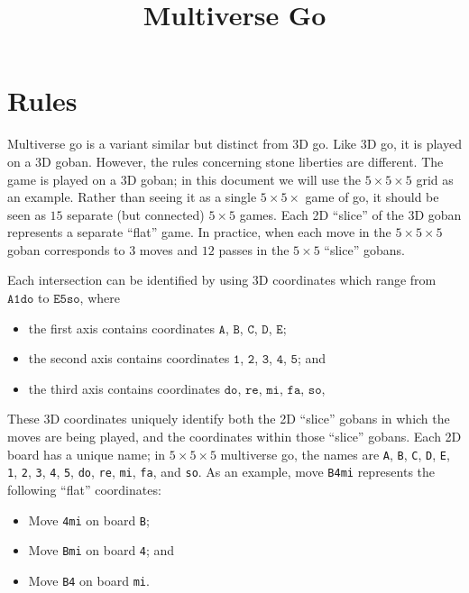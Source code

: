 \documentclass{article}
\title{Multiverse Go}
\date{}
\begin{document}
\maketitle

\pagestyle{empty}

\section{Rules}

Multiverse go is a variant similar but distinct from 3D go.  Like 3D go, it is
played on a 3D goban.  However, the rules concerning stone liberties are
different.
%
The game is played on a 3D goban;  in this document we will use the $5\times
5\times 5$ grid as an example.  Rather than seeing it as a single $5 \times
5\times$ game of go, it should be seen as $15$ separate (but connected)
$5\times 5$ games.  Each 2D ``slice'' of the 3D goban represents a separate
``flat'' game.  In practice, when each move in the $5\times 5\times 5$ goban
corresponds to $3$ moves and $12$ passes in the $5\times 5$ ``slice'' gobans.

Each intersection can be identified by using 3D coordinates which range from
$\texttt{A1do}$ to $\texttt{E5so}$, where
%
\begin{itemize}
  \item the first axis contains coordinates $\texttt{A}$, $\texttt{B}$, $\texttt{C}$, $\texttt{D}$, $\texttt{E}$;
  \item the second axis contains coordinates $\texttt{1}$, $\texttt{2}$, $\texttt{3}$, $\texttt{4}$, $\texttt{5}$; and
  \item the third axis contains coordinates $\texttt{do}$, $\texttt{re}$, $\texttt{mi}$, $\texttt{fa}$, $\texttt{so}$,
\end{itemize}


These 3D coordinates uniquely identify both the 2D ``slice'' gobans in which
the moves are being played, and the coordinates within those ``slice'' gobans.
%
Each 2D board has a unique name;  in $5\times 5\times 5$ multiverse go, the
names are 
%
\texttt{A}, \texttt{B}, \texttt{C}, \texttt{D}, \texttt{E},
%
\texttt{1}, \texttt{2}, \texttt{3}, \texttt{4}, \texttt{5},
%
\texttt{do}, \texttt{re}, \texttt{mi}, \texttt{fa}, and \texttt{so}.
%
As an example, move \texttt{B4mi} represents the following ``flat'' coordinates:
%
\begin{itemize}
  \item Move \texttt{4mi} on board \texttt{B};
  \item Move \texttt{Bmi} on board \texttt{4}; and
  \item Move \texttt{B4} on board \texttt{mi}.
\end{itemize}
\end{document}
